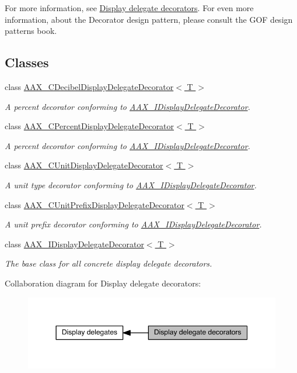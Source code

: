 For more information, see \hyperlink{a00346_displaydelegates_decorators}{Display delegate decorators}. For even more information, about the Decorator design pattern, please consult the G\+O\+F design patterns book. \subsection*{Classes}
\begin{DoxyCompactItemize}
\item 
class \hyperlink{a00015}{A\+A\+X\+\_\+\+C\+Decibel\+Display\+Delegate\+Decorator$<$ T $>$}
\begin{DoxyCompactList}\small\item\em A percent decorator conforming to \hyperlink{a00094}{A\+A\+X\+\_\+\+I\+Display\+Delegate\+Decorator}. \end{DoxyCompactList}\item 
class \hyperlink{a00036}{A\+A\+X\+\_\+\+C\+Percent\+Display\+Delegate\+Decorator$<$ T $>$}
\begin{DoxyCompactList}\small\item\em A percent decorator conforming to \hyperlink{a00094}{A\+A\+X\+\_\+\+I\+Display\+Delegate\+Decorator}. \end{DoxyCompactList}\item 
class \hyperlink{a00045}{A\+A\+X\+\_\+\+C\+Unit\+Display\+Delegate\+Decorator$<$ T $>$}
\begin{DoxyCompactList}\small\item\em A unit type decorator conforming to \hyperlink{a00094}{A\+A\+X\+\_\+\+I\+Display\+Delegate\+Decorator}. \end{DoxyCompactList}\item 
class \hyperlink{a00046}{A\+A\+X\+\_\+\+C\+Unit\+Prefix\+Display\+Delegate\+Decorator$<$ T $>$}
\begin{DoxyCompactList}\small\item\em A unit prefix decorator conforming to \hyperlink{a00094}{A\+A\+X\+\_\+\+I\+Display\+Delegate\+Decorator}. \end{DoxyCompactList}\item 
class \hyperlink{a00094}{A\+A\+X\+\_\+\+I\+Display\+Delegate\+Decorator$<$ T $>$}
\begin{DoxyCompactList}\small\item\em The base class for all concrete display delegate decorators. \end{DoxyCompactList}\end{DoxyCompactItemize}
Collaboration diagram for Display delegate decorators\+:
\nopagebreak
\begin{figure}[H]
\begin{center}
\leavevmode
\includegraphics[width=350pt]{a00347}
\end{center}
\end{figure}
